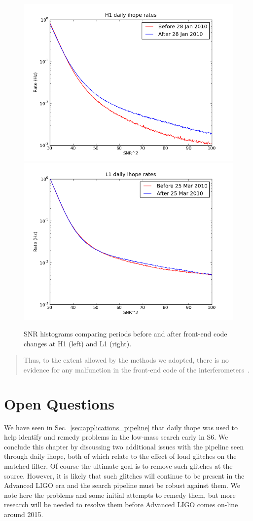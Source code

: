 \begin{figure}
  \includegraphics[width=0.5\linewidth]{figures/detchar/frontendtest_h1_log_2.png}
  \includegraphics[width=0.5\linewidth]{figures/detchar/frontendtest_l1_log_2.png}
  \caption[SNR histograms before and after code changes.] {
  \label{f:code_changes}
SNR histograms comparing periods before and after 
front-end code changes at H1 (left) and L1 (right).}
\end{figure}%


\begin{quote}
  Thus, to the extent allowed by the methods we adopted, there is no
  evidence for any malfunction in the front-end code of the
  interferometers~\cite{Whitcomb:injection}. 
\end{quote}



\section{Open Questions}
\label{sec:daily_ihope_open_questions}

We have seen in Sec.~\ref{sec:applications_pipeline} that daily ihope
was used to help identify and remedy problems in the low-mass search
early in S6.  We conclude this chapter by discussing two additional
issues with the pipeline seen through daily ihope, both of which
relate to the effect of loud glitches on the matched filter.  Of course
the ultimate goal is to remove such glitches at the source.  However,
it is likely that such glitches will continue to be present in the
Advanced LIGO era and the search pipeline must be robust against them.
We note here the problems and some initial attempts to remedy them,
but more research will be needed to resolve them before Advanced LIGO
comes on-line around 2015.


